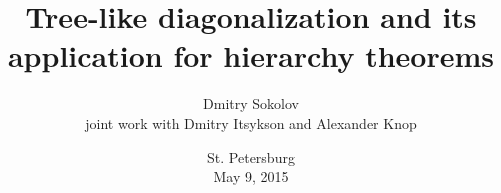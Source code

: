 

\title[Tree-like diagonalization]{
	Tree-like diagonalization and its application for hierarchy theorems
}
  
\author[Sokolov D.]{Dmitry Sokolov\\ joint work with Dmitry Itsykson and Alexander Knop}

\date{St. Petersburg\\
	May 9, 2015
}



	\maketitle

	
    
    



